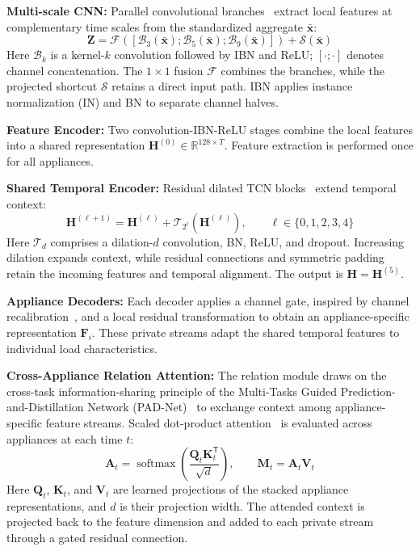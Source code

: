 \documentclass[journal]{IEEEtran}
\begin{document}
\textbf{Multi-scale CNN:}
Parallel convolutional branches~\cite{szegedy2015inception} extract local features at complementary time scales from the standardized aggregate $\bar{\mathbf{x}}$:
\begin{equation}
\mathbf{Z}=\mathcal{F}\!\left(
[\mathcal{B}_{3}(\bar{\mathbf{x}});\mathcal{B}_{5}(\bar{\mathbf{x}});
\mathcal{B}_{9}(\bar{\mathbf{x}})]\right)+\mathcal{S}(\bar{\mathbf{x}})
\label{eq:multiscale-fusion}
\end{equation}
Here $\mathcal{B}_{k}$ is a kernel-$k$ convolution followed by IBN and ReLU; $[\cdot;\cdot]$ denotes channel concatenation. The $1\times1$ fusion $\mathcal{F}$ combines the branches, while the projected shortcut $\mathcal{S}$ retains a direct input path. IBN applies instance normalization (IN) and BN to separate channel halves.

\textbf{Feature Encoder:}
Two convolution-IBN-ReLU stages combine the local features into a shared representation $\mathbf{H}^{(0)}\in\mathbb{R}^{128\times T}$. Feature extraction is performed once for all appliances.

\textbf{Shared Temporal Encoder:}
Residual dilated TCN blocks~\cite{lea2017tcn} extend temporal context:
\begin{equation}
\mathbf{H}^{(\ell+1)}=\mathbf{H}^{(\ell)}+
\mathcal{T}_{2^{\ell}}(\mathbf{H}^{(\ell)}),
\qquad \ell\in\{0,1,2,3,4\}
\label{eq:temporal-block}
\end{equation}
Here $\mathcal{T}_{d}$ comprises a dilation-$d$ convolution, BN, ReLU, and dropout. Increasing dilation expands context, while residual connections and symmetric padding retain the incoming features and temporal alignment. The output is $\mathbf{H}=\mathbf{H}^{(5)}$.

\textbf{Appliance Decoders:}
Each decoder applies a channel gate, inspired by channel recalibration~\cite{hu2018senet}, and a local residual transformation to obtain an appliance-specific representation $\mathbf{F}_i$. These private streams adapt the shared temporal features to individual load characteristics.

\textbf{Cross-Appliance Relation Attention:}
The relation module draws on the cross-task information-sharing principle of the Multi-Tasks Guided Prediction-and-Distillation Network (PAD-Net)~\cite{xu2018padnet} to exchange context among appliance-specific feature streams. Scaled dot-product attention~\cite{vaswani2017attention} is evaluated across appliances at each time $t$:
\begin{equation}
\mathbf{A}_t=\operatorname{softmax}\!\left(
\frac{\mathbf{Q}_t\mathbf{K}_t^{\mathsf T}}{\sqrt{d}}
\right),\qquad
\mathbf{M}_t=\mathbf{A}_t\mathbf{V}_t
\label{eq:relation-attention}
\end{equation}
Here $\mathbf{Q}_t$, $\mathbf{K}_t$, and $\mathbf{V}_t$ are learned projections of the stacked appliance representations, and $d$ is their projection width. The attended context is projected back to the feature dimension and added to each private stream through a gated residual connection.
\end{document}
